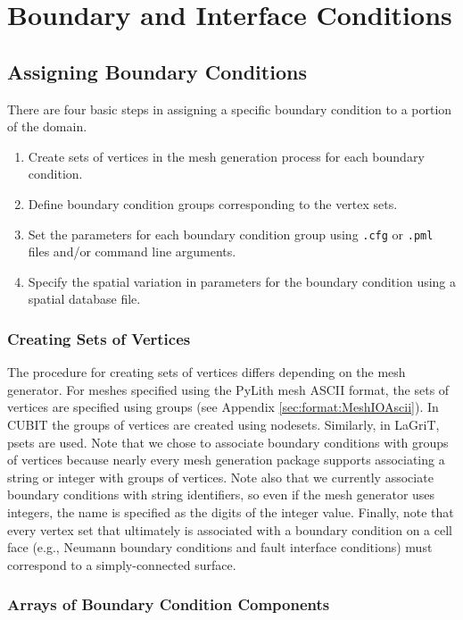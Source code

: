 
\chapter{\label{cha:boundary:interface:conditions}Boundary and Interface
Conditions}


\section{Assigning Boundary Conditions}

There are four basic steps in assigning a specific boundary condition
to a portion of the domain.
\begin{enumerate}
\item Create sets of vertices in the mesh generation process for each boundary
condition.
\item Define boundary condition groups corresponding to the vertex sets.
\item Set the parameters for each boundary condition group using \texttt{.cfg}
or \texttt{.pml} files and/or command line arguments.
\item Specify the spatial variation in parameters for the boundary condition
using a spatial database file.
\end{enumerate}

\subsection{Creating Sets of Vertices}

The procedure for creating sets of vertices differs depending on the
mesh generator. For meshes specified using the PyLith mesh ASCII format,
the sets of vertices are specified using groups (see Appendix \vref{sec:format:MeshIOAscii}).
In CUBIT the groups of vertices are created using nodesets. Similarly,
in LaGriT, psets are used. Note that we chose to associate boundary
conditions with groups of vertices because nearly every mesh generation
package supports associating a string or integer with groups of vertices.
Note also that we currently associate boundary conditions with string
identifiers, so even if the mesh generator uses integers, the name
is specified as the digits of the integer value. Finally, note that
every vertex set that ultimately is associated with a boundary condition
on a cell face (e.g., Neumann boundary conditions and fault interface
conditions) must correspond to a simply-connected surface.


\subsection{Arrays of Boundary Condition Components}

